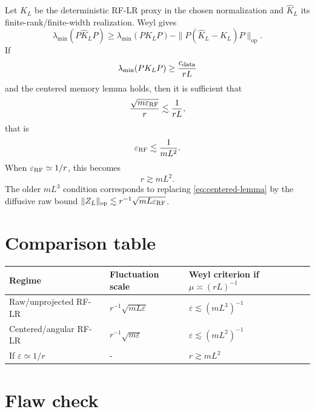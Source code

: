 \documentclass[11pt]{article}
\newcommand{\op}{\operatorname{op}}
\newcommand{\eps}{\varepsilon}
\begin{document}
Let $K_L$ be the deterministic RF-LR proxy in the chosen normalization and $\widehat K_L$ its finite-rank/finite-width realization.  Weyl gives
\begin{equation}
\lambda_{\min}(P\widehat K_LP)\ge \lambda_{\min}(PK_LP)-\|P(\widehat K_L-K_L)P\|_{\op}.
\end{equation}
If
\begin{equation}
\lambda_{\min}(PK_LP)\ge \frac{c_{\rm data}}{rL}
\end{equation}
and the centered memory lemma holds, then it is sufficient that
\begin{equation}
\frac{\sqrt{m\eps_{\rm RF}}}{r}\lesssim \frac1{rL},
\end{equation}
that is
\begin{equation}
\eps_{\rm RF}\lesssim \frac1{mL^2}.
\end{equation}
When $\eps_{\rm RF}\simeq 1/r$, this becomes
\begin{equation}
\boxed{r\gtrsim mL^2.}
\end{equation}
The older $mL^3$ condition corresponds to replacing \eqref{eq:centered-lemma} by the diffusive raw bound $\|Z_L\|_{\op}\lesssim r^{-1}\sqrt{mL\eps_{\rm RF}}$.

\section{Comparison table}

\begin{center}
\begin{tabular}{@{}lll@{}}
\toprule
Regime & Fluctuation scale & Weyl criterion if $\mu\asymp (rL)^{-1}$ \\
\midrule
Raw/unprojected RF-LR & $r^{-1}\sqrt{mL\eps}$ & $\eps\lesssim (mL^3)^{-1}$ \\
Centered/angular RF-LR & $r^{-1}\sqrt{m\eps}$ & $\eps\lesssim (mL^2)^{-1}$ \\
If $\eps\simeq 1/r$ & - & $r\gtrsim mL^2$ \\
\bottomrule
\end{tabular}
\end{center}

\section{Flaw check}
\end{document}
